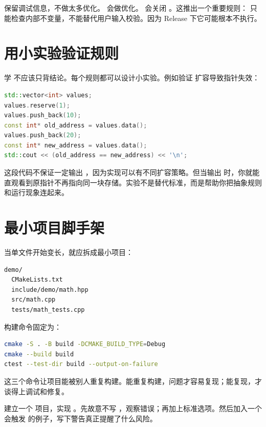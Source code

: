  保留调试信息，不做太多优化。 会做优化。 会关闭 。这推出一个重要规则： 只能检查内部不变量，不能替代用户输入校验。因为 Release 下它可能根本不执行。

\section{用小实验验证规则}

学 \cpp 不应该只背结论。每个规则都可以设计小实验。例如验证  扩容导致指针失效：

\begin{lstlisting}[language=C++,caption={观察 vector 扩容}]
std::vector<int> values;
values.reserve(1);
values.push_back(10);
const int* old_address = values.data();
values.push_back(20);
const int* new_address = values.data();
std::cout << (old_address == new_address) << '\n';
\end{lstlisting}

这段代码不保证一定输出 ，因为实现可以有不同扩容策略。但当输出  时，你就能直观看到原指针不再指向同一块存储。实验不是替代标准，而是帮助你把抽象规则和运行现象连起来。

\section{最小项目脚手架}

当单文件开始变长，就应拆成最小项目：

\begin{lstlisting}[caption={最小项目目录}]
demo/
  CMakeLists.txt
  include/demo/math.hpp
  src/math.cpp
  tests/math_tests.cpp
\end{lstlisting}

构建命令固定为：

\begin{lstlisting}[language=bash,caption={固定项目构建命令}]
cmake -S . -B build -DCMAKE_BUILD_TYPE=Debug
cmake --build build
ctest --test-dir build --output-on-failure
\end{lstlisting}

这三个命令让项目能被别人重复构建。能重复构建，问题才容易复现；能复现，才谈得上调试和修复。

\begin{exercisebox}
建立一个  项目，实现 。先故意不写 ，观察错误；再加上标准选项。然后加入一个会触发  的例子，写下警告真正提醒了什么风险。
\end{exercisebox}

